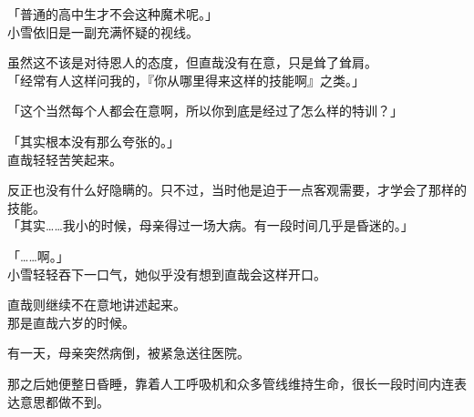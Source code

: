 「普通的高中生才不会这种魔术呢。」\\

小雪依旧是一副充满怀疑的视线。

虽然这不该是对待恩人的态度，但直哉没有在意，只是耸了耸肩。\\

「经常有人这样问我的，『你从哪里得来这样的技能啊』之类。」

「这个当然每个人都会在意啊，所以你到底是经过了怎么样的特训？」

「其实根本没有那么夸张的。」\\

直哉轻轻苦笑起来。

反正也没有什么好隐瞒的。只不过，当时他是迫于一点客观需要，才学会了那样的技能。\\

「其实……我小的时候，母亲得过一场大病。有一段时间几乎是昏迷的。」

「……啊。」\\

小雪轻轻吞下一口气，她似乎没有想到直哉会这样开口。

直哉则继续不在意地讲述起来。\\

那是直哉六岁的时候。

有一天，母亲突然病倒，被紧急送往医院。

那之后她便整日昏睡，靠着人工呼吸机和众多管线维持生命，很长一段时间内连表达意思都做不到。\\

